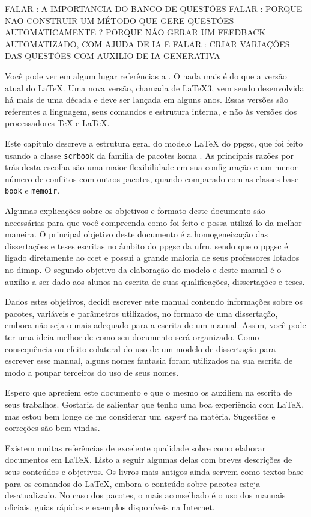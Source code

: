FALAR  : A IMPORTANCIA DO BANCO DE QUESTÕES
FALAR :  PORQUE NAO CONSTRUIR UM MÉTODO QUE GERE QUESTÕES AUTOMATICAMENTE ? PORQUE NÃO GERAR UM FEEDBACK AUTOMATIZADO, COM AJUDA DE IA E
FALAR : CRIAR VARIAÇÕES DAS QUESTÕES COM AUXILIO DE IA GENERATIVA

Você pode ver em algum lugar referências a \LaTeXe{}. O \LaTeXe{} nada mais é do que a versão atual do \LaTeX{}. Uma nova versão, chamada de \LaTeX{}3, vem sendo desenvolvida há mais de uma década e deve ser lançada em alguns anos. Essas versões são referentes a linguagem, seus comandos e estrutura interna, e não às versões dos processadores \TeX{} e \LaTeX{}.

Este capítulo descreve a estrutura geral do modelo \LaTeX{} do \gls{ppgsc}, que foi feito usando a classe \texttt{scrbook} da família de pacotes \gls{koma} \parencite{koma}. As principais razões por trás desta escolha são uma maior flexibilidade em sua configuração e um menor número de conflitos com outros pacotes, quando comparado com as classes base \texttt{book} e \texttt{memoir}. 

Algumas explicações sobre os objetivos e formato deste documento são necessárias para que você compreenda como foi feito e possa utilizá-lo da melhor maneira. O principal objetivo deste documento é a homogeneização das dissertações e teses escritas no âmbito do \gls{ppgsc} da \gls{ufrn}, sendo que o \gls{ppgsc} é ligado diretamente ao \gls{ccet} e possui a grande maioria de seus professores lotados no \gls{dimap}. O segundo objetivo da elaboração do modelo e deste manual é o auxílio a ser dado aos alunos na escrita de suas qualificações, dissertações e teses.

Dados estes objetivos, decidi escrever este manual contendo informações sobre os pacotes, variáveis e parâmetros utilizados, no formato de uma dissertação, embora não seja o mais adequado para a escrita de um manual. Assim, você pode ter uma ideia melhor de como seu documento será organizado. Como consequência ou efeito colateral do uso de um modelo de dissertação para escrever esse manual, alguns nomes fantasia foram utilizados na sua escrita de modo a poupar terceiros do uso de seus nomes.

Espero que apreciem este documento e que o mesmo os auxiliem na escrita de seus trabalhos. Gostaria de salientar que tenho uma boa experiência com \LaTeX , mas estou bem longe de me considerar um \textit{expert} na matéria. Sugestões e correções são bem vindas.

Existem muitas referências de excelente qualidade sobre como elaborar documentos em \LaTeX . Listo a seguir algumas delas com breves descrições de seus conteúdos e objetivos. Os livros mais antigos ainda servem como textos base para os comandos do \LaTeX{}, embora o conteúdo sobre pacotes esteja desatualizado. No caso dos pacotes, o mais aconselhado é o uso dos manuais oficiais, guias rápidos e exemplos disponíveis na Internet.

